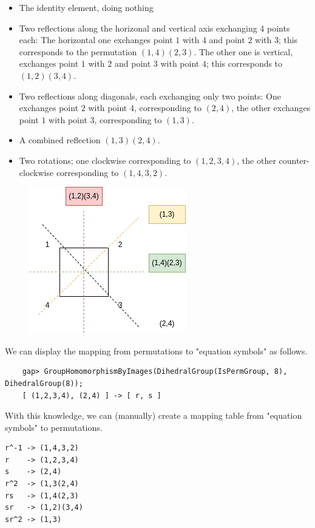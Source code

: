 \begin{itemize}
    \item The identity element, doing nothing
    \item Two reflections along the horizonal and vertical axis exchanging 4 points each: The horizontal one exchanges point $1$ with $4$ and point $2$ with $3$; this corresponds to the permutation $(1,4)(2,3)$. The other one is vertical, exchanges point $1$ with $2$ and point $3$ with point $4$; this corresponds to $(1,2)(3,4)$.
    \item Two reflections along diagonals, each exchanging only two points: One exchanges point $2$ with point $4$, corresponding to $(2,4)$, the other exchanges point $1$ with point $3$, corresponding to $(1,3)$.
    \item A combined reflection $(1,3)(2,4)$.
    \item Two rotations; one clockwise corresponding to $(1,2,3,4)$, the other counter-clockwise corresponding to $(1,4,3,2)$.
\end{itemize}


\begin{figure}[H]
    \centering
    \includegraphics[scale=0.75]{images/2023-06-05_groups_gap_D4_2.png}
\end{figure}

We can display the mapping from permutations to "equation symbols" as follows.

\begin{verbatim}
	gap> GroupHomomorphismByImages(DihedralGroup(IsPermGroup, 8), DihedralGroup(8));
	[ (1,2,3,4), (2,4) ] -> [ r, s ]
\end{verbatim}

With this knowledge, we can (manually) create a mapping table from "equation symbols" to permutations.

\begin{verbatim}
r^-1 -> (1,4,3,2)
r    -> (1,2,3,4)
s    -> (2,4)
r^2  -> (1,3(2,4)
rs   -> (1,4(2,3)
sr   -> (1,2)(3,4)
sr^2 -> (1,3)
\end{verbatim}

